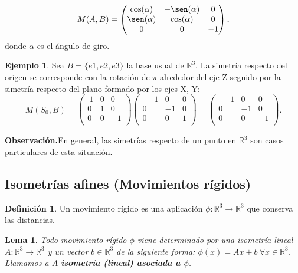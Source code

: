 \documentclass[11pt]{article}
\newtheorem{lema}{Lema}[section]
\theoremstyle{definition}
\newtheorem{mydef}{Definición}[section]
\newtheorem{ejemplo}{Ejemplo}[section]
\begin{document}
    \[M(A, B)=\begin{pmatrix}\cos(\alpha)&-\sen(\alpha)&0\\\sen(\alpha)&\cos(\alpha)&0\\0&0&-1\end{pmatrix},\]
donde $\alpha$ es el ángulo de giro.

\begin{ejemplo}
Sea $B=\{e1 , e2 , e3\}$ la base usual de  $\mathbb{R}^3$. La simetría respecto del origen se corresponde con la rotación de $\pi$ alrededor del eje Z seguido por la simetría respecto del plano formado por los ejes X, Y:
\[M(S_0,B)=
    \begin{pmatrix}
    \ 1 & 0 & 0 \\ 0 & 1 & 0 \\ 0 & 0 & -1 \\
    \end{pmatrix}
    \begin{pmatrix}
    \ -1 & 0 & 0 \\ 0 & -1 & 0 \\ 0 & 0 & 1 \\
    \end{pmatrix}=
    \begin{pmatrix}
    \ -1 & 0 & 0 \\ 0 & -1 & 0 \\ 0 & 0 & -1 \\
    \end{pmatrix}.
  \]
\end{ejemplo}

\noindent\textbf{Observación.}\quad En general, las simetrías respecto de un punto en $\mathbb R^3$ son casos particulares de esta situación.
    \\

\subsection{Isometrías afines (Movimientos rígidos)}
	\begin{mydef}
    Un movimiento rígido es una aplicación $\phi:\mathbb R^3\rightarrow\mathbb R^3$ que conserva las distancias.
    \end{mydef}
    \begin{lema}
    Todo movimiento rígido $\phi$ viene determinado por una isometría lineal $A:\mathbb R^3\rightarrow\mathbb R^3$ y un vector $b\in \mathbb R^3$ de la siguiente forma: $\phi(x)=Ax+b\ \forall x\in\mathbb R^3$. Llamamos a $A$ \textbf{isometría (lineal) asociada a $\phi$}.
    \end{lema}
\end{document}
